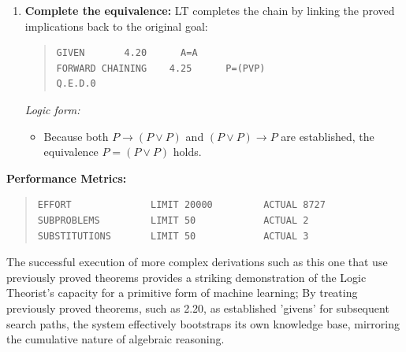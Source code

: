 \documentclass[journal]{IEEEtran}
\begin{document}
\begin{enumerate}
\item \textbf{Complete the equivalence:}
LT completes the chain by linking the proved implications back to the original goal:
\begin{quote}
\begin{verbatim}
GIVEN       4.20      A=A
FORWARD CHAINING    4.25      P=(PVP)
Q.E.D.0
\end{verbatim}
\end{quote}
\textit{Logic form:} 
\begin{itemize}
    \item[] Because both $P \rightarrow (P \lor P)$ and $(P \lor P) \rightarrow P$ are established, the equivalence $P = (P \lor P)$ holds.
\end{itemize}

\end{enumerate}

\textbf{Performance Metrics:}
\begin{quote}
\begin{verbatim}
EFFORT              LIMIT 20000         ACTUAL 8727
SUBPROBLEMS         LIMIT 50            ACTUAL 2
SUBSTITUTIONS       LIMIT 50            ACTUAL 3
\end{verbatim}
\end{quote}

\medskip

\noindent The successful execution of more complex derivations such as
this one that use previously proved theorems provides a striking
demonstration of the Logic Theorist’s capacity for a primitive form of
machine learning; By treating previously proved theorems, such as
2.20, as established 'givens' for subsequent search paths, the system
effectively bootstraps its own knowledge base, mirroring the
cumulative nature of algebraic reasoning.
\end{document}
